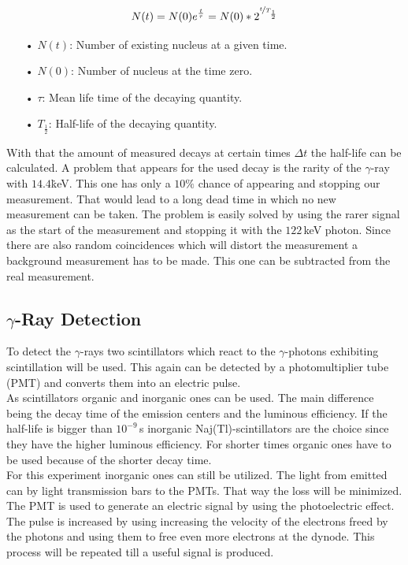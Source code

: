 \documentclass[30pt,a4paper]{article}
\begin{document}
 	\begin{equation}
 		N(t)=N(0) e^{\frac{t}{\tau}}=N(0) *2^{\nicefrac{t}{T_\frac{1}{2}}}
 		\label{eq1}
 	\end{equation}
 	\begin{enumerate}
 		\item[•] $N(t)$: Number of existing nucleus at a given time.
 		\item[•] $N(0)$: Number of nucleus at the time zero.
 		\item[•] $\tau$: Mean life time of the decaying quantity.
 		\item[•] $T_\frac{1}{2}$: Half-life of the decaying quantity.
 	\end{enumerate}
	With that the amount of measured decays at certain times $\Delta t$ the half-life can be calculated. A problem that appears for the used decay is the rarity of the $\gamma$-ray with $14.4$\.keV. This one has only a $10\%$ chance of appearing and stopping our measurement. That would lead to a long dead time in which no new measurement can be taken. The problem is easily solved by using the rarer signal as the start of the measurement and stopping it with the $122$\,keV photon. Since there are also random coincidences which will distort the measurement a background measurement has to be made. This one can be subtracted from the real measurement.
 	
 	\subsection{$\gamma$-Ray Detection}
 	To detect the $\gamma$-rays two scintillators which react to the $\gamma$-photons exhibiting scintillation will be used. This again can be detected by a photomultiplier tube (PMT) and converts them into an electric pulse.\\
 	As scintillators organic and inorganic ones can be used. The main difference being the decay time of the emission centers and the luminous efficiency. If the half-life is bigger than $10^{-9}$\,s inorganic Naj(Tl)-scintillators are the choice since they have the higher luminous efficiency. For shorter times organic ones have to be used because of the shorter decay time.\\ For this experiment inorganic ones can still be utilized. The light from emitted can by light transmission bars to the PMTs. That way the loss will be minimized. \\ The PMT is used to generate an electric signal by using the photoelectric effect. The pulse is increased by using increasing the velocity of the electrons freed by the photons and using them to free even more electrons at the dynode. This process will be repeated till a useful signal is produced.
\end{document}
